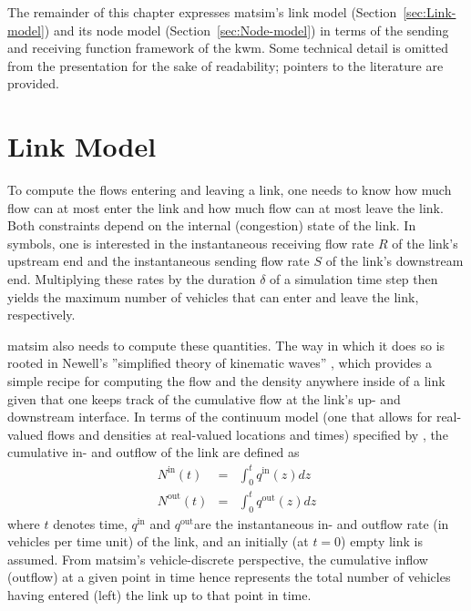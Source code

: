 The remainder of this chapter expresses \gls{matsim}\textquoteright{}s link
model (Section~\ref{sec:Link-model}) and its node model (Section~\ref{sec:Node-model})
in terms of the sending and receiving function framework of the \gls{kwm}.
Some technical detail is omitted from the presentation for the sake
of readability; pointers to the literature are provided.

\section{\label{sec:Link-model}Link Model}
To compute the flows entering and leaving a link, one needs to know
how much flow can at most enter the link and how much flow can at
most leave the link. Both constraints depend on the internal (congestion)
state of the link. In symbols, one is interested in the instantaneous
receiving flow rate $R$ of the link's upstream end and the instantaneous
sending flow rate $S$ of the link's downstream end. Multiplying these
rates by the duration $\delta$ of a simulation time step then yields
the maximum number of vehicles that can enter and leave the link,
respectively.

\gls{matsim} also needs to compute these quantities. The way in which it
does so is rooted in Newell's {}''simplified theory of kinematic
waves'' \citep{newell-1993}, which provides a simple recipe for
computing the flow and the density anywhere inside of a link given
that one keeps track of the cumulative flow at the link's up- and
downstream interface. In terms of the continuum model (\ie one that
allows for real-valued flows and densities at real-valued locations
and times) specified by \citet{newell-1993}, the cumulative in- and
outflow of the link are defined as
\begin{eqnarray}
N^{\text{in}}(t) & = & \int_{0}^{t}q^{\text{in}}(z)dz\label{eq:cum-in}\\
N^{\text{out}}(t) & = & \int_{0}^{t}q^{\text{out}}(z)dz\label{eq:cum-out}
\end{eqnarray}
where $t$ denotes time, $q^{\text{in}}$ and $q^{\text{out}}$are
the instantaneous in- and outflow rate (in vehicles per time unit)
of the link, and an initially (at $t=0$) empty link is assumed. From
\gls{matsim}'s vehicle-discrete perspective, the cumulative inflow (outflow)
at a given point in time hence represents the total number of vehicles
having entered (left) the link up to that point in time.

